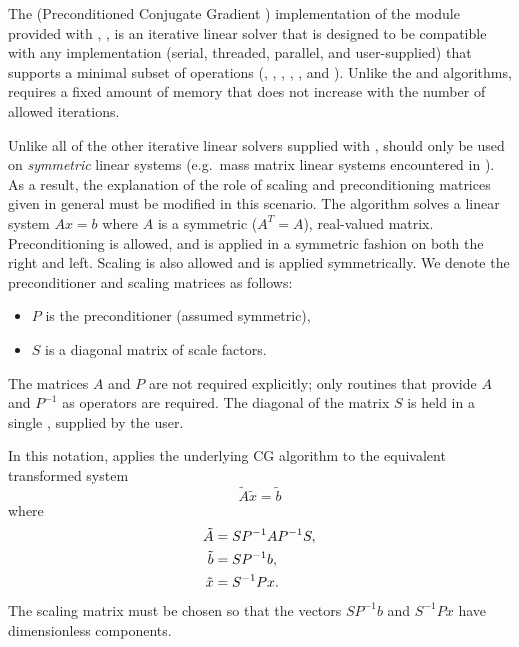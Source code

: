 
The {\pcg} (Preconditioned Conjugate Gradient \cite{HeSt:52})
implementation of the {\sunlinsol} module provided with {\sundials},
{\sunlinsolpcg}, is an iterative linear solver that is designed to be
compatible with any {\nvector} implementation (serial, threaded,
parallel, and user-supplied) that supports a minimal subset of operations
(, , , ,
, and ).  Unlike the {\spgmr} and {\spfgmr}
algorithms, {\pcg} requires a fixed amount of memory that does not
increase with the number of allowed iterations.

Unlike all of the other iterative linear solvers supplied with
{\sundials}, {\pcg} should only be used on \emph{symmetric} linear
systems (e.g.~mass matrix linear systems encountered in
{\arkode}). As a result, the explanation of the role of scaling and
preconditioning matrices given in general must be modified in this
scenario.  The {\pcg} algorithm solves a linear system $Ax = b$ where  
$A$ is a symmetric ($A^T=A$), real-valued matrix.  Preconditioning is
allowed, and is applied in a symmetric fashion on both the right and
left.  Scaling is also allowed and is applied symmetrically.  We
denote the preconditioner and scaling matrices as follows:
\begin{itemize}
\item $P$ is the preconditioner (assumed symmetric),
\item $S$ is a diagonal matrix of scale factors.
\end{itemize}
The matrices $A$ and $P$ are not required explicitly; only routines
that provide $A$ and $P^{-1}$ as operators are required.  The diagonal
of the matrix $S$ is held in a single {\nvector}, supplied by the user.

In this notation, {\pcg} applies the underlying CG algorithm to the
equivalent transformed system 
\begin{equation}
  \label{eq:transformed_linear_systemPCG}
  \tilde{A} \tilde{x} = \tilde{b}
\end{equation}
where
\begin{align}
  \notag
  \tilde{A} &= S P^{-1} A P^{-1} S,\\
  \label{eq:transformed_linear_system_componentsPCG}
  \tilde{b} &= S P^{-1} b,\\
  \notag
  \tilde{x} &= S^{-1} P x.
\end{align} 
The scaling matrix must be chosen so that the vectors $SP^{-1}b$ and
$S^{-1}Px$ have dimensionless components.


